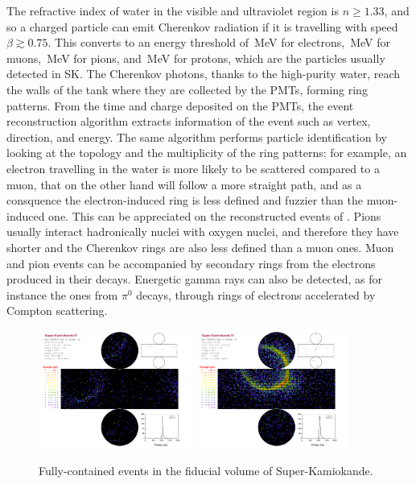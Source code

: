 The refractive index of water in the visible and ultraviolet region is $n \geq 1.33$, %
and so a charged particle can emit Cherenkov radiation if it is travelling %
with speed $\beta \gtrsim 0.75$.
This converts to an energy threshold of \,MeV for electrons, \,MeV for muons, %
\,MeV for pions, and \,MeV for protons, which are the particles usually detected in SK.
The Cherenkov photons, thanks to the high-purity water, reach the walls of the tank where they %
are collected by the PMTs, forming ring patterns.
From the time and charge deposited on the PMTs, the event reconstruction algorithm extracts information of the event %
such as vertex, direction, and energy.
The same algorithm performs particle identification by looking at the topology and the multiplicity of the ring patterns: %
for example, an electron travelling in the water is more likely to be scattered compared to a muon, %
that on the other hand will follow a more straight path, and as a consquence %
the electron-induced ring is less defined and fuzzier than the muon-induced one.
This can be appreciated on the reconstructed events of .
Pions usually interact hadronically nuclei with oxygen nuclei, and therefore they have shorter %
and the Cherenkov rings are also less defined than a muon ones.
Muon and pion events can be accompanied by secondary rings from the electrons produced in their decays.
Energetic gamma rays can also be detected, as for instance the ones from $\pi^0$ decays, %
through rings of electrons accelerated by Compton scattering.

\begin{figure}
	\centering
	\includegraphics[width=0.45\textwidth]{pics/Electron.pdf}
	\includegraphics[width=0.45\textwidth]{pics/Muon.pdf}
	\caption{Fully-contained events in the fiducial volume of Super-Kamiokande.}
	\label{fig:sk_events}
\end{figure}


